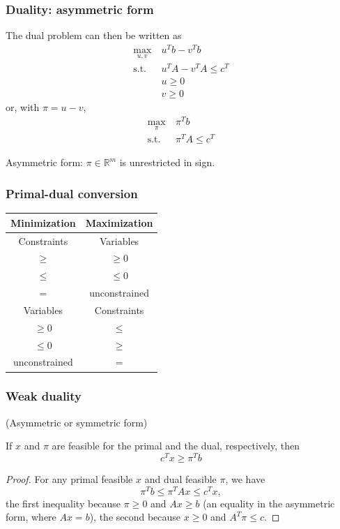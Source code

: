 \documentclass[aspectratio=169]{beamer}
\def\RR{\mathbb{R}}
\begin{document}
\begin{frame}
	\frametitle{Duality: asymmetric form}
	
The dual problem can then be written as
	\begin{align*}
		\max_{u, v} \ & u^T b - v^T b \\
		\mbox{s.t. } & u^T A - v^T A \leq c^T \\
		& u \geq 0 \\
		& v \geq 0
	\end{align*}
	or, with $\pi = u - v$,
	\begin{align*}
		\max_{\pi} \ & \pi^T b \\
		\mbox{s.t. } & \pi^T A \leq c^T
	\end{align*}
	
Asymmetric form: $\pi \in \RR^m$ is unrestricted in sign.
	
\end{frame}


\begin{frame}
	\frametitle{Primal-dual conversion}
	
	\begin{center}
		\begin{tabular}{|c|c|}
			\hline
			\hline
			{\bf Minimization} & {\bf Maximization} \\
			\hline
			\hline
			Constraints & Variables \\
			\hline
			$\geq$ & $\geq 0$ \\
			$\leq$ & $\leq 0$ \\
			$=$ & unconstrained \\
			\hline
			\hline
			Variables & Constraints \\
			\hline
			$\geq 0$ & $\leq$ \\
			$\leq 0$ & $\geq$ \\
			unconstrained & $=$ \\
			\hline
		\end{tabular}
	\end{center}
	
\end{frame}

\begin{frame}
	\frametitle{Weak duality}
	
	(Asymmetric or symmetric form)
	
	\mbox{}
	
	If $x$ and $\pi$ are feasible for the primal and the dual, respectively, then
	\[
	c^T x \geq \pi^T b
	\]
	
	\begin{proof}
		For any primal feasible $x$ and dual feasible $\pi$, we have
		\[
		\pi^T b \leq \pi^TAx \leq c^Tx,
		\]
		the first inequality because $\pi \geq 0$ and $Ax \geq b$ (an equality in the asymmetric form, where $Ax = b$), the second because $x \geq 0$ and $A^T\pi \leq c$.
	\end{proof}
	
\end{frame}
\end{document}
